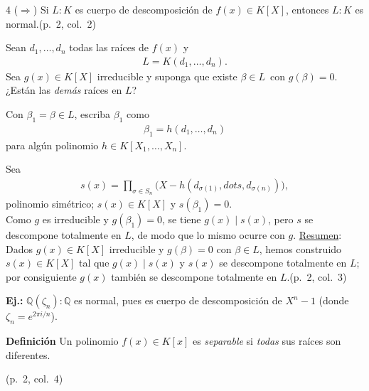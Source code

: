 \documentclass[landscape,a4paper]{article}
\begin{document}
\begin{multicols}{4}
($\Rightarrow$)\; Si $L:K$ es cuerpo de descomposición de $f(x)\in K[X]$, entonces $L:K$ es normal.\hfill(p.~2, col.~2)

Sean $d_{1},\dots,d_{n}$ todas las raíces de $f(x)$ y
\begin{align*}
L=K(d_{1},\dots,d_{n}).
\end{align*}
Sea $g(x)\in K[X]$ irreducible y suponga que existe $\beta\in L$\, con $g(\beta)=0$.  
¿Están las \emph{demás} raíces en $L$?

Con $\beta_{1}=\beta\in L$, escriba $\beta_{1}$ como
\begin{align*}
\beta_{1}=h(d_{1},\dots,d_{n})
\end{align*}
para algún polinomio $h\in K[X_{1},\dots,X_{n}]$.

Sea
\begin{align*}
s(x)=\prod_{\sigma\in S_{n}}\!\bigl(X-h(d_{\sigma(1)},dots,d_{\sigma(n)})\bigr),
\end{align*}
polinomio simétrico; $s(x)\in K[X]$ y $s(\beta_{1})=0$.\\
Como $g$ es irreducible y $g(\beta_{1})=0$, se tiene $g(x)\mid s(x)$,  
pero $s$ se descompone totalmente en $L$, de modo que lo mismo ocurre con $g$.
\noindent\underline{Resumen}:  
Dados $g(x)\in K[X]$ irreducible y $g(\beta)=0$ con $\beta\in L$,  
hemos construido $s(x)\in K[X]$ tal que $g(x)\mid s(x)$ y $s(x)$ se descompone totalmente en $L$;  
por consiguiente $g(x)$ también se descompone totalmente en $L$.\hfill(p.~2, col.~3)

\textbf{Ej.:}\; $\mathbb{Q}(\zeta_{n}):\mathbb{Q}$ es normal,  
pues es cuerpo de descomposición de $X^{n}-1$ (donde $\zeta_{n}=e^{2\pi i/n}$).

\begin{tcolorbox}[title={Extensiones separables},colback=white,
                 colframe=blue!80!black,colbacktitle=blue!80!black,coltitle=white]
\textbf{Definición}\; Un polinomio $f(x)\in K[x]$ es \emph{separable} si \emph{todas} sus raíces son diferentes.
\end{tcolorbox}\hfill(p.~2, col.~4)


\end{multicols}
\end{document}
